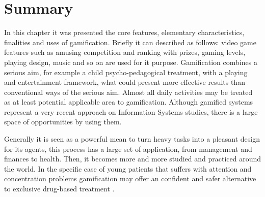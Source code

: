 \section{Summary}

In this chapter it was presented the core features, elementary characteristics, finalities and uses of gamification. Briefly it can described as follows: video game features such as amusing competition and ranking with prizes, gaming levels, playing design, music and so on are used for it purpose. Gamification combines a serious aim, for example a child psycho-pedagogical treatment, with a playing and entertainment framework, what could present more effective results than conventional ways of the serious aim. Almost all daily activities may be treated as at least potential applicable area to gamification. Although gamified systems represent a very recent approach on Information Systems studies, there is a large space of opportunities by using them.

Generally it is seen as a powerful mean to turn heavy tasks into a pleasant design for its agents, this process has a large set of application, from management and finances to health.  Then, it becomes more and more studied and practiced around the world. In the specific case of young patients that suffers with attention and concentration problems gamification may offer an confident and safer alternative to exclusive drug-based treatment \citep{Nemeth}.
